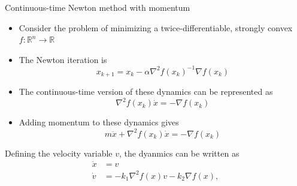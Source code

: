 \begin{frame}{Continuous-time Newton method with momentum}
\begin{itemize}
	\item Consider the problem of minimizing a twice-differentiable, strongly convex $f:\mathbb{R}^n\rightarrow \mathbb{R}$
	\pause
	\item The Newton iteration is
	\begin{equation}
	x_{k+1}=x_k - \alpha\nabla^2f(x_k)^{-1} \nabla f(x_k)
	\end{equation}
	\pause
	\item The continuous-time version of these dynamics can be represented as
	\begin{equation}
	\nabla^2f(x_k)\dot{x}= - \nabla f(x_k)
	\end{equation}
	\pause
	\item Adding momentum to these dynamics gives  
	\begin{equation}
	m\ddot{x}+ \nabla^2f(x_k)\dot{x}= - \nabla f(x_k)
	\end{equation}
\end{itemize}
\pause
Defining the velocity variable $v$, the dyanmics can be written as 
\begin{equation} \label{eqn: second_order_newton_cont_time}
\begin{split}
\Dot{x}&=v\\
\Dot{v}&=-k_1\nabla^2 f(x) v -k_2 \nabla f(x), 
\end{split}
\end{equation}
\end{frame}
